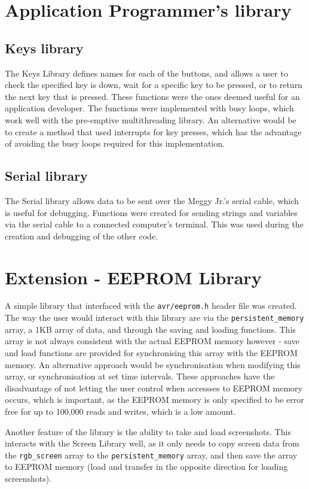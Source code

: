 \documentclass[twoside,a4paper]{article}
\begin{document}
\section*{Application Programmer's library}
\subsection*{Keys library}
The Keys Library defines names for each of the buttons, and allows a user to check the specified key is down, wait for a specific key to be pressed, or to return the next key that is pressed. These functions were the ones deemed useful for an application developer.  The functions were implemented with busy loops, which work well with the pre-emptive multithreading library. An alternative would be to create a method that used interrupts for key presses, which has the advantage of avoiding the busy loops required for this implementation.
\subsection*{Serial library}
The Serial library allows data to be sent over the Meggy Jr.'s serial cable, which is useful for debugging. Functions were created for sending strings and variables via the serial cable to a connected computer's terminal. This was used during the creation and debugging of the other code.

\section*{Extension - EEPROM Library}
A simple library that interfaced with the \texttt{avr/eeprom.h} header file was created. The way the user would interact with this library are via the \texttt{persistent\_memory} array, a 1KB array of data, and through the saving and loading functions. This array is not always consistent with the actual EEPROM memory however - save and load functions are provided for synchronising this array with the EEPROM memory. An alternative approach would be synchronisation when modifying this array, or synchronisation at set time intervals. These approaches have the disadvantage of not letting the user control when accessses to EEPROM memory occurs, which is important, as the EEPROM memory is only specified to be error free for up to 100,000 reads and writes, which is a low amount.

Another feature of the library is the ability to take and load screenshots. This interacts with the Screen Library well, as it only needs to copy screen data from the \texttt{rgb\_screen} array to the \texttt{persistent\_memory} array, and then save the array to EEPROM memory (load and transfer in the opposite direction for loading screenshots).
\end{document}
